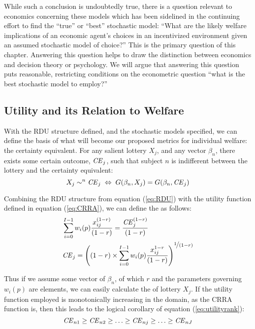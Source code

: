 While such a conclusion is undoubtedly true, there is a question relevant to economics concerning these models which has been sidelined in the continuing effort to find the \enquote{true} or \enquote{best} stochastic model: \enquote{What are the likely welfare implications of an economic agent's choices in an incentivized environment given an assumed stochastic model of choice?} This is the primary question of this chapter.
Answering this question helps to draw the distinction between economics and decision theory or psychology.
We will argue that answering this question puts reasonable, restricting conditions on the econometric question \enquote{what is the best stochastic model to employ?}

\subsection{Utility and its Relation to Welfare}

With the RDU structure defined, and the stochastic models specified, we can define the basis of what will become our proposed metrics for individual welfare: the certainty equivalent.
For any salient lottery $X_j$, and any vector $\beta_n$, there exists some certain outcome, $\mathit{CE}_j$, such that subject $n$ is indifferent between the lottery and the certainty equivalent:
\begin{equation}
	\label{eq:CE.indiff}
	X_j \sim^n {\mathit{CE}}_j \;\Leftrightarrow\; G(\beta_n,X_j) = G(\beta_n, {\mathit{CE}}_j)
\end{equation}

Combining the RDU structure from equation (\ref{eq:RDU}) with the utility function defined in equation (\ref{eq:CRRA}), we can define the {\CE} as follows:
\begin{align}
	\label{eq:CEcalc}
	\begin{split}
		&\sum_{i=0}^{I-1} w_i(p) \frac{x_{ij}^{(1-r)}}{(1-r)} = \frac{ {\mathit{CE}}_j^{(1-r)}}{(1-r)}\\
		&{\mathit{CE}}_j =  \left( (1-r) \times \sum_{i=0}^{I-1} w_i(p) \frac{x_{ij}^{1-r}}{(1-r)} \right)^{ \displaystyle\nicefrac{1}{(1-r)} }
	\end{split}
\end{align}

Thus if we assume some vector of $\beta_n$, of which $r$ and the parameters governing $w_i(p)$ are elements, we can easily calculate the {\CE} of lottery $X_j$.{\footnotemark}
If the utility function employed is monotonically increasing in the domain, as the CRRA function is, then this leads to the  logical corollary of equation (\ref{eq:utilityrank}):
\begin{equation}
	\label{eq:CErank}
	{\ensuremath{\mathit{CE}}}_{n1} \geq {\ensuremath{\mathit{CE}}}_{n2} \geq \ldots \geq {\ensuremath{\mathit{CE}}}_{nj} \geq \ldots \geq {\ensuremath{\mathit{CE}}}_{nJ}
\end{equation}

